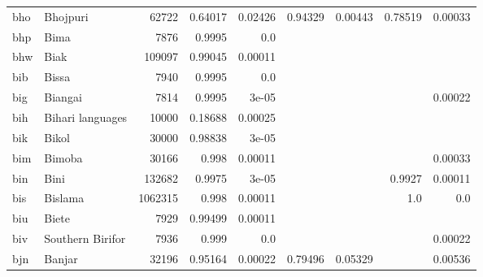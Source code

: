 \documentclass[11pt]{article}
\begin{document}
\begin{table*}[ht]
{\begin{tabular}{llrrrrrrr}
bho         & Bhojpuri         & 62722         & 0.64017         & 0.02426         & 0.94329         & 0.00443         & 0.78519         & 0.00033         \\

bhp         & Bima         & 7876         & 0.9995         & 0.0         &          &          &          &          \\

bhw         & Biak         & 109097         & 0.99045         & 0.00011         &          &          &          &          \\

bib         & Bissa         & 7940         & 0.9995         & 0.0         &          &          &          &          \\

big         & Biangai         & 7814         & 0.9995         & 3e-05         &          &          &          & 0.00022         \\

bih         & Bihari languages         & 10000         & 0.18688         & 0.00025         &          &          &          &          \\

bik         & Bikol         & 30000         & 0.98838         & 3e-05         &          &          &          &          \\

bim         & Bimoba         & 30166         & 0.998         & 0.00011         &          &          &          & 0.00033         \\

bin         & Bini         & 132682         & 0.9975         & 3e-05         &          &          & 0.9927         & 0.00011         \\

bis         & Bislama         & 1062315         & 0.998         & 0.00011         &          &          & 1.0         & 0.0         \\

biu         & Biete         & 7929         & 0.99499         & 0.00011         &          &          &          &          \\

biv         & Southern Birifor         & 7936         & 0.999         & 0.0         &          &          &          & 0.00022         \\

bjn         & Banjar         & 32196         & 0.95164         & 0.00022         & 0.79496         & 0.05329         &          & 0.00536         \\


\end{tabular}}
\end{table*}
\end{document}
